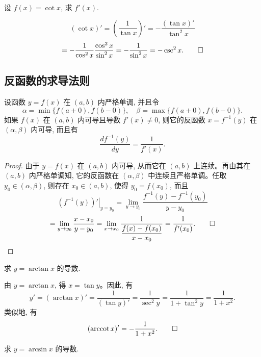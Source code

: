 \begin{example}\label{example:ma-4-2-2}
设 $f(x)=\cot x$, 求 $f'(x)$.
\end{example}


\begin{solve}
\[
  (\cot x)'=\left(\frac1{\tan x}\right)'
  =
  -\frac{(\tan x)'}{\tan^2 x}
\]
\[
  =
  -\frac1{\cos^2 x}\frac{\cos^2 x}{\sin^2 x}
  =
  -\frac1{\sin^2 x}
  =
  -\operatorname{csc}^2x.
\qedhere
\]
\end{solve}


\subsection{反函数的求导法则}
\label{subsec:ma-4-2-2}

\begin{theorem}\label{theorem:ma-4-2-2}
设函数 $y=f(x)$ 在 $(a,b)$ 内严格单调, 并且令
\[
  \alpha=\min\{f(a+0),f(b-0)\},
  \quad
  \beta=\max\{f(a+0),f(b-0)\}.
\]
如果 $f(x)$ 在 $(a,b)$ 内可导且导数 $f'(x)\ne0$, 则它的反函数 $x=f^{-1}(y)$ 在 $(\alpha,\beta)$ 内可导, 而且有
\[
  \frac{df^{-1}(y)}{dy}=\frac1{f'(x)}.
\]
\end{theorem}


\begin{proof}
由于 $y=f(x)$ 在 $(a,b)$ 内可导, 从而它在 $(a,b)$ 上连续。再由其在 $(a,b)$ 内严格单调知, 它的反函数在 $(\alpha,\beta)$ 中连续且严格单调。任取 $y_0\in(\alpha,\beta)$, 则存在 $x_0\in(a,b)$, 使得 $y_0=f(x_0)$, 而且
\[
  \left.(f^{-1}(y))'\right|_{y=y_0}
  =
  \lim_{y\to y_0}\frac{f^{-1}(y)-f^{-1}(y_0)}{y-y_0}
\]
\[
  =
  \lim_{y\to y_0}\frac{x-x_0}{y-y_0}
  =
  \lim_{x\to x_0}
  \frac1{\dfrac{f(x)-f(x_0)}{x-x_0}}
  =
  \frac1{f'(x_0)}.
\qedhere
\]
\end{proof}


\begin{example}\label{example:ma-4-2-3}
求 $y=\arctan x$ 的导数.
\end{example}


\begin{solve}
由 $y=\arctan x$, 得 $x=\tan y$。因此, 有
\[
  y'=(\arctan x)'=\frac1{(\tan y)'}
  =\frac1{\sec^2 y}
  =\frac1{1+\tan^2 y}
  =\frac1{1+x^2}.
\]
类似地, 有
\[
  (\operatorname{arccot}x)'=-\frac1{1+x^2}.
\qedhere
\]
\end{solve}


\begin{example}\label{example:ma-4-2-4}
求 $y=\arcsin x$ 的导数.
\end{example}


